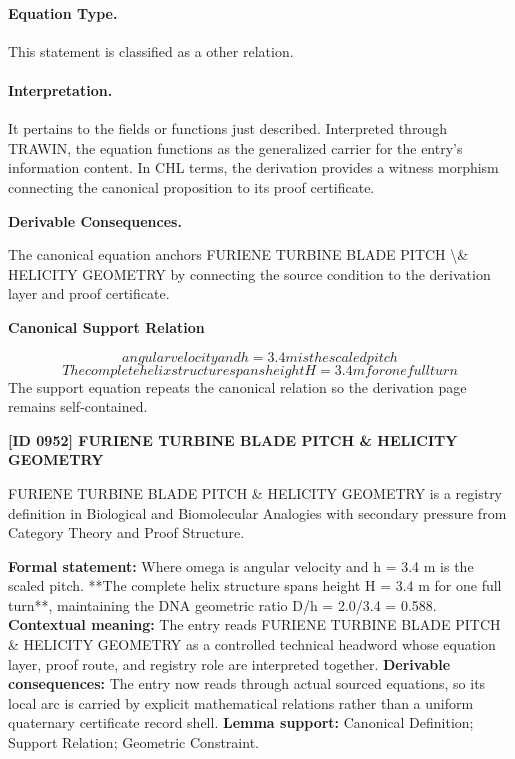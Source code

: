 \paragraph{Equation Type.}
This statement is classified as a other relation.

\paragraph{Interpretation.}
It pertains to the fields or functions just described. Interpreted through TRAWIN, the equation functions as the generalized carrier for the entry’s information content. In CHL terms, the derivation provides a witness morphism connecting the canonical proposition to its proof certificate.

\par\vspace{0.35em}
\noindent\textbf{Derivable Consequences.}\quad
\begingroup
\footnotesize
\raggedright
The canonical equation anchors FURIENE TURBINE BLADE PITCH \textbackslash{}\& HELICITY GEOMETRY by connecting the source condition to the derivation layer and proof certificate.
\par\endgroup

\noindent\textbf{Canonical Support Relation}\par
\[
angular velocity and h = 3.4 m is the scaled pitch
\]
\[
The complete helix structure spans height H = 3.4 m for one full turn
\]
\noindent The support equation repeats the canonical relation so the derivation page remains self-contained.\par

\clearpage
\noindent\textbf{[ID 0952] FURIENE TURBINE BLADE PITCH \& HELICITY GEOMETRY}\par
\vspace{0.35em}
\begingroup\small
{}
FURIENE TURBINE BLADE PITCH \& HELICITY GEOMETRY is a registry definition in Biological and Biomolecular Analogies with secondary pressure from Category Theory and Proof Structure.

\begingroup\footnotesize\setlength{\emergencystretch}{3em}\sloppy
\textbf{Formal statement:} Where omega is angular velocity and h = 3.4 m is the scaled pitch. **The complete helix structure spans height H = 3.4 m for one full turn**, maintaining the DNA geometric ratio D/h = 2.0/3.4 = 0.588. \textbf{Contextual meaning:} The entry reads FURIENE TURBINE BLADE PITCH \& HELICITY GEOMETRY as a controlled technical headword whose equation layer, proof route, and registry role are interpreted together. \textbf{Derivable consequences:} The entry now reads through actual sourced equations, so its local arc is carried by explicit mathematical relations rather than a uniform quaternary certificate record shell. \textbf{Lemma support:} Canonical Definition; Support Relation; Geometric Constraint.\par
\endgroup

